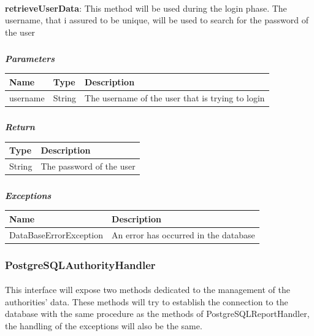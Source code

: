 					\paragraph{}
							\textbf{retrieveUserData}: This method will be used during the login phase. The username, that i assured to be unique, will be used to search for the password of the user
							\subparagraph{}
							\textit{\textbf{Parameters}}
								\begin{table}[!h]
									\begin{tabular}{L{0.2\textwidth}L{0.2\textwidth}L{0.2\textwidth}}
										\toprule
										Name & Type & Description \\
										\midrule
								  		username & String & The username of the user that is trying to login \\
								 		\bottomrule
									\end{tabular}
								\end{table}
							\subparagraph{}
								\textit{\textbf{Return}}
									\begin{table}[!h]
									\begin{tabular}{L{0.3\textwidth}L{0.3\textwidth}}
										\toprule
										Type & Description \\
										\midrule
								  	String & The password of the user \\
								 		\bottomrule
									\end{tabular}
								\end{table}
							\subparagraph{}
								\textit{\textbf{Exceptions}}
									\begin{table}[!h]
									\begin{tabular}{L{0.3\textwidth}L{0.3\textwidth}}
										\toprule
										Name & Description \\
										\midrule
								  		DataBaseErrorException & An error has occurred in the database \\ 
								 		\bottomrule
									\end{tabular}
								\end{table}

				\subsubsection{PostgreSQLAuthorityHandler}
					\paragraph{}
						This interface will expose two methods dedicated to the management of the authorities' data. These methods will try to establish the connection to the database with the same procedure as the methods of PostgreSQLReportHandler, the handling of the exceptions will also be the same.
						
